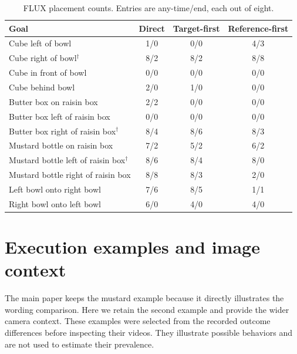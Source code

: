 \documentclass{article}
\begin{document}
\begin{table}[htbp]\centering\small
\caption{FLUX placement counts. Entries are any-time/end, each out of eight.}
\begin{tabular}{@{}p{.48\linewidth}ccc@{}}\toprule Goal & Direct & Target-first & Reference-first\\\midrule

Cube left of bowl & 1/0 & 0/0 & 4/3\\

Cube right of bowl$^\dagger$ & 8/2 & 8/2 & 8/8\\

Cube in front of bowl & 0/0 & 0/0 & 0/0\\

Cube behind bowl & 2/0 & 1/0 & 0/0\\

Butter box on raisin box & 2/2 & 0/0 & 0/0\\

Butter box left of raisin box & 0/0 & 0/0 & 0/0\\

Butter box right of raisin box$^\dagger$ & 8/4 & 8/6 & 8/3\\

Mustard bottle on raisin box & 7/2 & 5/2 & 6/2\\

Mustard bottle left of raisin box$^\dagger$ & 8/6 & 8/4 & 8/0\\

Mustard bottle right of raisin box & 8/8 & 8/3 & 2/0\\

Left bowl onto right bowl & 7/6 & 8/5 & 1/1\\

Right bowl onto left bowl & 6/0 & 4/0 & 4/0\\

\bottomrule\end{tabular}\end{table}

\FloatBarrier
\section{Execution examples and image context}
\label{app:executions}
The main paper keeps the mustard example because it directly illustrates the wording comparison. Here we retain the second example and provide the wider camera context. These examples were selected from the recorded outcome differences before inspecting their videos. They illustrate possible behaviors and are not used to estimate their prevalence.
\end{document}
